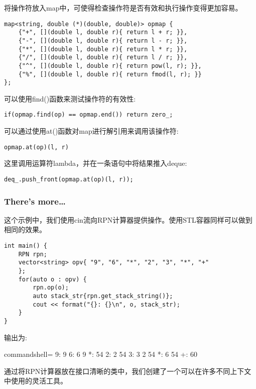将操作符放入map中，可使得检查操作符是否有效和执行操作变得更加容易。

\begin{lstlisting}[style=styleCXX]
map<string, double (*)(double, double)> opmap {
	{"+", [](double l, double r){ return l + r; }},
	{"-", [](double l, double r){ return l - r; }},
	{"*", [](double l, double r){ return l * r; }},
	{"/", [](double l, double r){ return l / r; }},
	{"^", [](double l, double r){ return pow(l, r); }},
	{"%", [](double l, double r){ return fmod(l, r); }}
};
\end{lstlisting}

可以使用find()函数来测试操作符的有效性:

\begin{lstlisting}[style=styleCXX]
if(opmap.find(op) == opmap.end()) return zero_;
\end{lstlisting}

可以通过使用at()函数对map进行解引用来调用该操作符:

\begin{lstlisting}[style=styleCXX]
opmap.at(op)(l, r)
\end{lstlisting}

这里调用运算符lambda，并在一条语句中将结果推入deque:

\begin{lstlisting}[style=styleCXX]
deq_.push_front(opmap.at(op)(l, r));
\end{lstlisting}

\subsubsection{There's more…}

这个示例中，我们使用cin流向RPN计算器提供操作。使用STL容器同样可以做到相同的效果。

\begin{lstlisting}[style=styleCXX]
int main() {
	RPN rpn;
	vector<string> opv{ "9", "6", "*", "2", "3", "*", "+"
	};
	for(auto o : opv) {
		rpn.op(o);
		auto stack_str{rpn.get_stack_string()};
		cout << format("{}: {}\n", o, stack_str);
	}
}
\end{lstlisting}

输出为:

\begin{tcblisting}{commandshell={}}
9: 9
6: 6 9
*: 54
2: 2 54
3: 3 2 54
*: 6 54
+: 60
\end{tcblisting}

通过将RPN计算器放在接口清晰的类中，我们创建了一个可以在许多不同上下文中使用的灵活工具。







